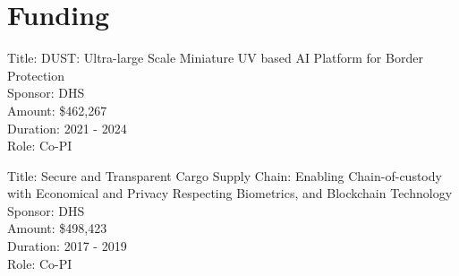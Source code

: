 

\section*{Funding}
\begin{compactitem}
    \item Title: DUST: Ultra-large Scale Miniature UV based AI Platform for Border Protection\\
    Sponsor: DHS\\
    Amount: \$462,267\\
    Duration: 2021 - 2024\\
    Role: Co-PI
    \item 	Title: Secure and Transparent Cargo Supply Chain: Enabling Chain-of-custody with Economical and Privacy Respecting Biometrics, and Blockchain Technology\\
    Sponsor: DHS\\
    Amount: \$498,423\\
    Duration: 2017 - 2019\\
    Role: Co-PI
\end{compactitem}
